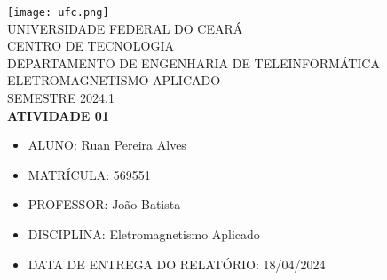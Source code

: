 

\usepackage{listings}
\usepackage{amsmath,amssymb,caption}
\newcommand{\tarc}{\mbox{\large$\frown$}}
\newcommand{\arc}[1]{\stackrel{\tarc}{#1}}




\clearpage
\thispagestyle{empty}

\begin{bfseries}
\begin{center}

\texttt{[image: ufc.png]} \\
\vspace{-4pt} 
UNIVERSIDADE FEDERAL DO CEARÁ \\
\vspace{4pt} 
CENTRO DE TECNOLOGIA \\
\vspace{4pt} 
DEPARTAMENTO DE ENGENHARIA DE TELEINFORMÁTICA \\
\vspace{4pt}
ELETROMAGNETISMO APLICADO \\
\vspace{4pt}
SEMESTRE 2024.1 \\


\vspace*{\fill}
\textbf{ATIVIDADE 01}
\vspace*{\fill}

\end{center}

\begin{itemize}[leftmargin=*]
    \setlength{\itemsep}{0pt}
    \item[] ALUNO: Ruan Pereira Alves
    \item[] MATRÍCULA: 569551
    \item[] PROFESSOR: João Batista
    \item[] DISCIPLINA: Eletromagnetismo Aplicado
    \item[] DATA DE ENTREGA DO RELATÓRIO: 18/04/2024
\end{itemize}

\end{bfseries}

